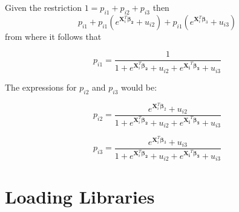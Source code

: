 \documentclass[
  12pt,
]{book}
\begin{document}
Given the restriction \(1 = p_{i1} + p_{i2} + p_{i3}\) then
\[p_{i1} + p_{i1}(e^{\boldsymbol{X}_{i}^{T}\boldsymbol{\beta_{2}}}+  u_{i2})+p_{i1}(e^{\boldsymbol{X}_{i}^{T}\boldsymbol{\beta}_{3}} + u_{i3})\] from where it follows that

\[
p_{i1}=\frac{1}{1+e^{\boldsymbol{X}_{i}^{T}\boldsymbol{\beta_{2}}}+ u_{i2}+e^{\boldsymbol{X_{i}}^{T}\boldsymbol{\beta_{3}}}+ u_{i3}}
\]

The expressions for \(p_{i2}\) and \(p_{i3}\) would be:

\[
p_{i2}=\frac{e^{\boldsymbol{X}_{i}^{T}\boldsymbol{\beta}_{2}} + u_{i2}}{1+e^{\boldsymbol{X}_{i}^{T}\boldsymbol{\beta_{2}}}+ u_{i2}+e^{\boldsymbol{X_{i}}^{T}\boldsymbol{\beta_{3}}}+ u_{i3}}
\]

\[
p_{i3}=\frac{e^{\boldsymbol{X}_{i}^{T}\boldsymbol{\beta}_{3}}+ u_{i3}}{1+e^{\boldsymbol{X}_{i}^{T}\boldsymbol{\beta_{2}}}+ u_{i2}+e^{\boldsymbol{X_{i}}^{T}\boldsymbol{\beta_{3}}}+ u_{i3}}
\]

\hypertarget{loading-libraries}{%
\section{Loading Libraries}\label{loading-libraries}}
\end{document}
